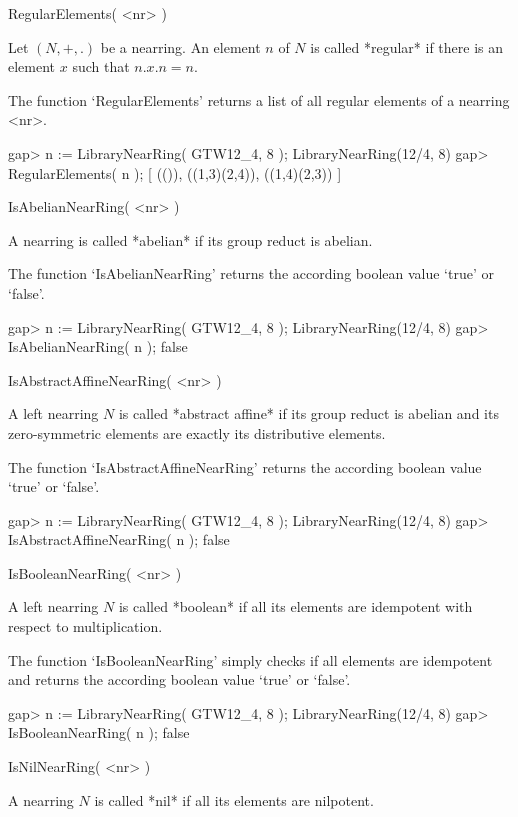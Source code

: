 \>RegularElements( <nr> )

Let $(N,+,.)$ be a nearring. An element $n$ of $N$ is called *regular* if
there is an element $x$ such that $n. x. n = n$.

The function `RegularElements' returns a list of all regular elements of a
nearring <nr>.

\beginexample
    gap> n := LibraryNearRing( GTW12_4, 8 );            
    LibraryNearRing(12/4, 8)
    gap> RegularElements( n );
    [ (()), ((1,3)(2,4)), ((1,4)(2,3)) ]
\endexample



\>IsAbelianNearRing( <nr> )

A nearring is called *abelian* if its group reduct is abelian.

The function `IsAbelianNearRing' returns the according boolean value
`true' or `false'.

\beginexample
    gap> n := LibraryNearRing( GTW12_4, 8 );            
    LibraryNearRing(12/4, 8)
    gap> IsAbelianNearRing( n );
    false
\endexample

\>IsAbstractAffineNearRing( <nr> )

A left nearring $N$ is called *abstract affine* if its group reduct is
abelian and its zero-symmetric elements are exactly its distributive
elements.

The function `IsAbstractAffineNearRing' returns the according boolean 
value `true' or `false'.

\beginexample
    gap> n := LibraryNearRing( GTW12_4, 8 );            
    LibraryNearRing(12/4, 8)
    gap> IsAbstractAffineNearRing( n );
    false
\endexample

\>IsBooleanNearRing( <nr> )

A left nearring $N$ is called *boolean* if all its elements are
idempotent with respect to multiplication.

The function `IsBooleanNearRing' simply checks if all elements
are idempotent and returns the according boolean value 
`true' or `false'.

\beginexample
    gap> n := LibraryNearRing( GTW12_4, 8 );            
    LibraryNearRing(12/4, 8)
    gap> IsBooleanNearRing( n );
    false
\endexample

\>IsNilNearRing( <nr> )

A nearring $N$ is called *nil* if all its elements are nilpotent.

